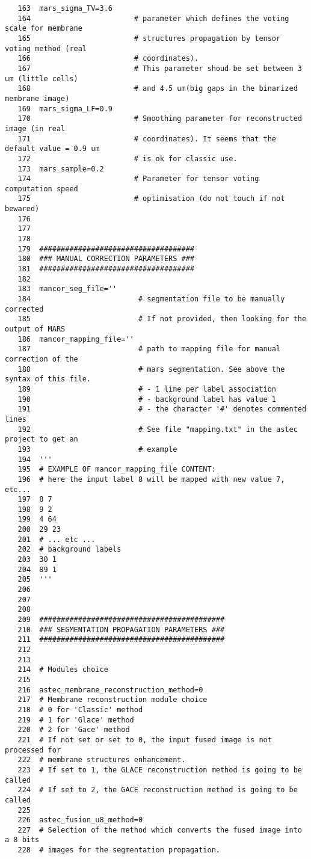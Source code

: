 \begin{verbatim}
   163	mars_sigma_TV=3.6     
   164	                      # parameter which defines the voting scale for membrane
   165						  # structures propagation by tensor voting method (real
   166						  # coordinates). 
   167					 	  # This parameter shoud be set between 3 um (little cells)
   168					 	  # and 4.5 um(big gaps in the binarized membrane image)
   169	mars_sigma_LF=0.9     
   170	                      # Smoothing parameter for reconstructed image (in real
   171						  # coordinates). It seems that the default value = 0.9 um
   172						  # is ok for classic use.
   173	mars_sample=0.2       
   174	                      # Parameter for tensor voting computation speed 
   175						  # optimisation (do not touch if not bewared)
   176	
   177	
   178	
   179	####################################
   180	### MANUAL CORRECTION PARAMETERS ###
   181	####################################
   182	
   183	mancor_seg_file='' 	   
   184	                       # segmentation file to be manually corrected
   185						   # If not provided, then looking for the output of MARS
   186	mancor_mapping_file='' 
   187	                       # path to mapping file for manual correction of the 
   188						   # mars segmentation. See above the syntax of this file.
   189						   # - 1 line per label association
   190						   # - background label has value 1
   191						   # - the character '#' denotes commented lines 
   192						   # See file "mapping.txt" in the astec project to get an
   193						   # example
   194	'''
   195	# EXAMPLE OF mancor_mapping_file CONTENT:
   196	# here the input label 8 will be mapped with new value 7, etc...
   197	8 7
   198	9 2  
   199	4 64 
   200	29 23
   201	# ... etc ...
   202	# background labels
   203	30 1 
   204	89 1 
   205	'''
   206	
   207	
   208	
   209	###########################################
   210	### SEGMENTATION PROPAGATION PARAMETERS ###
   211	###########################################
   212	
   213	
   214	# Modules choice
   215	
   216	astec_membrane_reconstruction_method=0
   217	# Membrane reconstruction module choice
   218	# 0 for 'Classic' method
   219	# 1 for 'Glace' method
   220	# 2 for 'Gace' method
   221	# If not set or set to 0, the input fused image is not processed for 
   222	# membrane structures enhancement.
   223	# If set to 1, the GLACE reconstruction method is going to be called
   224	# If set to 2, the GACE reconstruction method is going to be called
   225	
   226	astec_fusion_u8_method=0
   227	# Selection of the method which converts the fused image into a 8 bits
   228	# images for the segmentation propagation. 

\end{verbatim}
